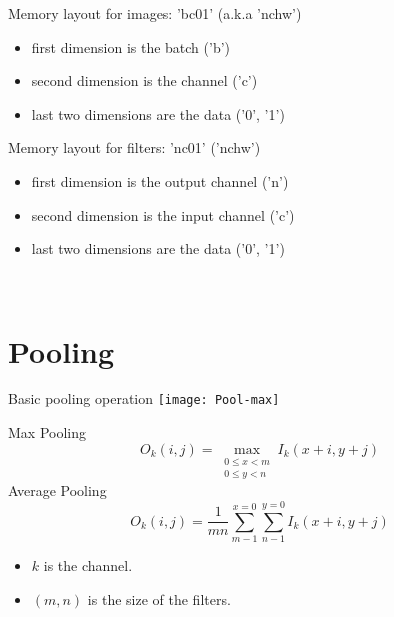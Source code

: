 \documentclass[utf8x,hyperref={pdfpagelabels=false}]{beamer}
\begin{document}
\begin{frame}
Memory layout for images: 'bc01' (a.k.a 'nchw')

\begin{itemize}
\item first dimension is the batch ('b')
\item second dimension is the channel ('c')
\item last two dimensions are the data ('0', '1')
\end{itemize}

Memory layout for filters: 'nc01' ('nchw')

\begin{itemize}
\item first dimension is the output channel ('n')
\item second dimension is the input channel ('c')
\item last two dimensions are the data ('0', '1')
\end{itemize}

\ \\

\end{frame}

\section{Pooling}

\begin{frame}
Basic pooling operation
\texttt{[image: Pool-max]}
\end{frame}

\begin{frame}
Max Pooling
\begin{displaymath}
O_k(i, j) = \max_{\substack{0 \leq x < m \\ 0 \leq y < n}} I_k(x + i, y + j)
\end{displaymath}
Average Pooling
\begin{displaymath}
O_k(i, j) = \frac{1}{mn}\sum^{x = 0}_{m - 1} \sum^{y = 0}_{n - 1} I_k(x + i, y + j)
\end{displaymath}
\begin{itemize}
\item $k$ is the channel.
\item $(m, n)$ is the size of the filters.
\end{itemize}
\end{frame}
\end{document}
